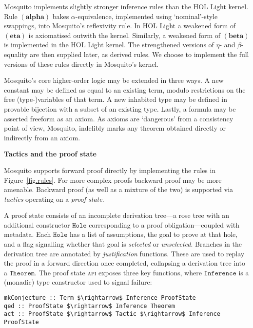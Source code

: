 \documentclass{llncs}
\newcommand{\mosquito}{Mosquito\xspace}
\newcommand{\rulefont}[1]{\ensuremath{(\mathbf{#1})}}
\begin{document}
\mosquito implements slightly stronger inference rules than the HOL Light kernel.
Rule \rulefont{alpha} bakes $\alpha$-equivalence, implemented using `nominal'-style swappings, into \mosquito's reflexivity rule.
In HOL Light a weakened form of \rulefont{eta} is axiomatised outwith the kernel.
Similarly, a weakened form of \rulefont{beta} is implemented in the HOL Light kernel.
The strengthened versions of $\eta$- and $\beta$-equality are then supplied later, as derived rules.
We choose to implement the full versions of these rules directly in \mosquito's kernel.

\mosquito's core higher-order logic may be extended in three ways.
A new constant may be defined as equal to an existing term, modulo restrictions on the free (type-)variables of that term.
A new inhabited type may be defined in provable bijection with a subset of an existing type.
Lastly, a formula may be asserted freeform as an axiom.
As axioms are `dangerous' from a consistency point of view, \mosquito, indelibly marks any theorem obtained directly or indirectly from an axiom.

\noindent\newline
\textbf{Tactics and the proof state}
\newline

\mosquito supports forward proof directly by implementing the rules in Figure~\ref{fig.rules}.
For more complex proofs backward proof may be more amenable.
Backward proof (as well as a mixture of the two) is supported via \emph{tactics} operating on a \emph{proof state}.

A proof state consists of an incomplete derivation tree---a rose tree with an additional constructor $\mathtt{Hole}$ corresponding to a proof obligation---coupled with metadata.
Each $\mathtt{Hole}$ has a list of assumptions, the goal to prove at that hole, and a flag signalling whether that goal is \emph{selected} or \emph{unselected}.
Branches in the derivation tree are annotated by \emph{justification} functions.
These are used to replay the proof in a forward direction once completed, collapsing a derivation tree into a $\mathtt{Theorem}$.
The proof state \textsc{api} exposes three key functions, where $\mathtt{Inference}$ is a (monadic) type constructor used to signal failure:
\begin{lstlisting}
mkConjecture :: Term $\rightarrow$ Inference ProofState
qed :: ProofState $\rightarrow$ Inference Theorem
act :: ProofState $\rightarrow$ Tactic $\rightarrow$ Inference ProofState
\end{lstlisting}
\end{document}
